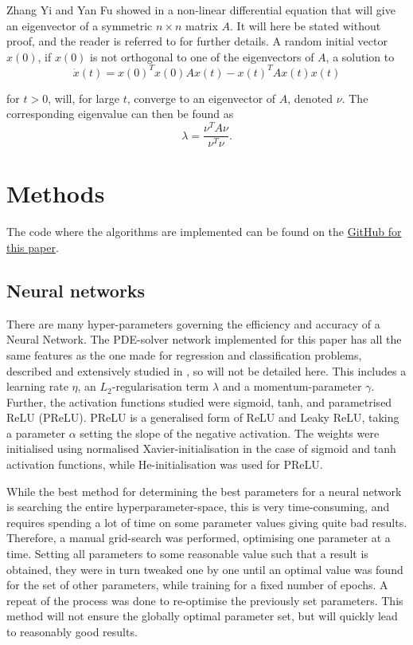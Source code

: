 \documentclass[multicolumn, 9pt]{extarticle}
\begin{document}
Zhang Yi and Yan Fu showed in \cite{symmetric} a non-linear differential equation that will give an eigenvector of a symmetric $n\times n$ matrix $A$. It will here be stated without proof, and the reader is referred to \cite{symmetric} for further details. A random initial vector $x(0)$, if $x(0)$ is not orthogonal to one of the eigenvectors of $A$, a solution to
\begin{equation}\label{eq:diff_sym}
	\dot{x}(t) = x(0)^Tx(0)Ax(t)-x(t)^TAx(t)x(t)
\end{equation}

for $t>0$, will, for large $t$, converge to an eigenvector of $A$, denoted $\nu$. The corresponding eigenvalue can then be found as
\begin{equation}
	\label{eq:eigval}
	\lambda = \frac{\nu^TA\nu}{\nu^T\nu}.
\end{equation}


\section{Methods}
The code where the algorithms are implemented can be found on the \href{https://github.com/SaraPJensen/FYS-STK/tree/main/Project3/code}{GitHub for this paper}.

\subsection{Neural networks}
There are many hyper-parameters governing the efficiency and accuracy of a Neural Network. The PDE-solver network implemented for this paper has all the same features as the one made for regression and classification problems, described and extensively studied in \cite{p2HO}, so will not be detailed here. This includes a learning rate $\eta$, an $L_2$-regularisation term $\lambda$ and a momentum-parameter $\gamma$. Further, the activation functions studied were sigmoid, tanh, and parametrised ReLU (PReLU). PReLU is a generalised form of ReLU and Leaky ReLU, taking a parameter $\alpha$ setting the slope of the negative activation. The weights were initialised using normalised Xavier-initialisation in the case of sigmoid and tanh activation functions, while He-initialisation was used for PReLU.

While the best method for determining the best parameters for a neural network is searching the entire hyperparameter-space, this is very time-consuming, and requires spending a lot of time on some parameter values giving quite bad results. Therefore, a manual grid-search was performed, optimising one parameter at a time. Setting all parameters to some reasonable value such that a result is obtained, they were in turn tweaked one by one until an optimal value was found for the set of other parameters, while training for a fixed number of epochs. A repeat of the process was done to re-optimise the previously set parameters. This method will not ensure the globally optimal parameter set, but will quickly lead to reasonably good results.
\end{document}
